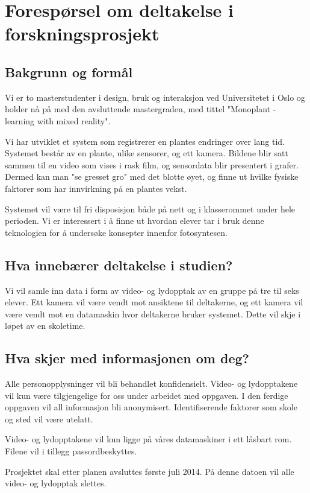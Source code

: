 \documentclass[a4paper,norsk,12pt]{article} %
\begin{document}
\section*{Forespørsel om deltakelse i forskningsprosjekt}

\subsection*{Bakgrunn og formål}
Vi er to masterstudenter i design, bruk og interaksjon ved Universitetet i Oslo og holder nå på med den avsluttende mastergraden, med tittel "Monoplant - learning with mixed reality". 

Vi har utviklet et system som registrerer en plantes endringer over lang tid. Systemet består av en plante, ulike sensorer, og ett kamera. Bildene blir satt sammen til en video som vises i rask film, og sensordata blir presentert i grafer. Dermed kan man "se gresset gro" med det blotte øyet, og finne ut hvilke fysiske faktorer som har innvirkning på en plantes vekst. 

Systemet vil være til fri disposisjon både på nett og i klasserommet under hele perioden. Vi er interessert i å finne ut hvordan elever tar i bruk denne teknologien for å undersøke konsepter innenfor fotosyntesen. 

\subsection*{Hva innebærer deltakelse i studien?}
Vi vil samle inn data i form av video- og lydopptak av en gruppe på tre til seks elever. Ett kamera vil være vendt mot ansiktene til deltakerne, og ett kamera vil være vendt mot en datamaskin hvor deltakerne bruker systemet. Dette vil skje i løpet av en skoletime. 

\subsection*{Hva skjer med informasjonen om deg?}
Alle personopplysninger vil bli behandlet konfidensielt. Video- og lydopptakene vil kun være tilgjengelige for oss under arbeidet med oppgaven. I den ferdige oppgaven vil all informasjon bli anonymisert. Identifiserende faktorer som skole og sted vil være utelatt. 

Video- og lydopptakene vil kun ligge på våres datamaskiner i ett låsbart rom. Filene vil i tillegg passordbeskyttes. 

Prosjektet skal etter planen avsluttes første juli 2014. På denne datoen vil alle video- og lydopptak slettes. 
\end{document}
